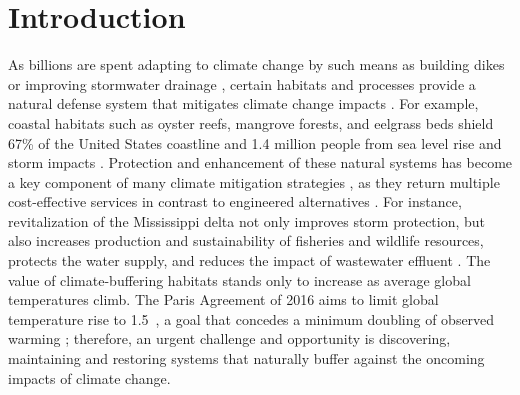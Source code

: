 \documentclass{AGUJournal}
\begin{document}
\section{Introduction}

As billions are spent adapting to climate change by such means as building dikes or improving stormwater drainage \citep{Narain:2011}, certain habitats and processes provide a natural defense system that mitigates climate change impacts \citep{Jones:2012}. For example, coastal habitats such as oyster reefs, mangrove forests, and eelgrass beds shield 67\% of the United States coastline and 1.4 million people from sea level rise and storm impacts \citep{Arkema:2013}. Protection and enhancement of these natural systems has become a key component of many climate mitigation strategies \citep{Guerry:2015}, as they return multiple cost-effective services in contrast to engineered alternatives \citep{Jones:2012}. For instance, revitalization of the Mississippi delta not only improves storm protection, but also increases production and sustainability of fisheries and wildlife resources, protects the water supply, and reduces the impact of wastewater effluent \citep{LDNR:1998}. The value of climate-buffering habitats stands only to increase as average global temperatures climb. The Paris Agreement of 2016 aims to limit global temperature rise to 1.5\celsius~\citep{Hulme:2016}, a goal that concedes a minimum doubling of observed warming \citep{Hartmann:2013}; therefore, an urgent challenge and opportunity is discovering, maintaining and restoring systems that naturally buffer against the oncoming impacts of climate change.
\end{document}
